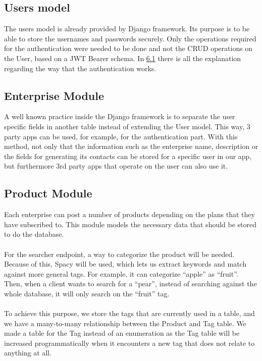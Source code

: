 \documentclass[./main.tex]{subfiles}
\begin{document}
\subsection{Users model}

The users model is already provided by Django framework. Its purpose is
to be able to store the usernames and passwords securely. Only
the operations required for the authentication were needed to be done
and not the CRUD operations on the User, based on a JWT Bearer schema.
In \protect\hyperlink{org712facd}{6.1} there is all the explanation
regarding the way that the authentication works.


\subsection{Enterprise Module}

A well known practice inside the Django framework is to separate the
user specific fields in another table instead of extending the User
model. This way, 3 party apps can be used, for example, for the
authentication part. With this method, not only that the information
such as the enterprise name, description or the fields for generating
its contacts can be stored for a specific user in our app, but
furthermore 3rd party apps that operate on the user can also use it.


\subsection{Product Module}

Each enterprise can post a number of products depending on the plans
that they have subscribed to. This module models the necessary data that
should be stored to do the database.
\\
\\

For the searcher endpoint, a way to categorize the product will be
needed. Because of this, Spacy will be used, which lets us extract keywords and
match against more general tags. For example, it can categorize
``apple'' as ``fruit''. Then, when a client wants to search for a
``pear'', instead of searching against the whole database, it will only
search on the ``fruit'' tag.
\\
\\

To achieve this purpose, we store the tags that are currently used in a
table, and we have a many-to-many relationship between the Product and
Tag table. We made a table for the Tag instead of an enumeration as the
Tag table will be increased programmatically when it encounters a new tag
that does not relate to anything at all.
\\
\\
\end{document}
